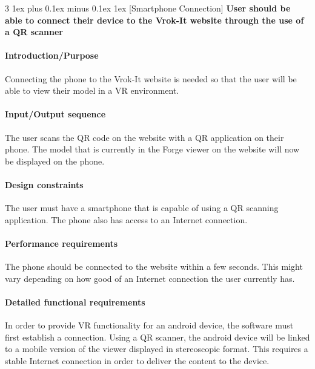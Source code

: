 \documentclass[letterpaper, 10pt, draftclsnofoot, compsoc, onecolumn]{IEEEtran}
\makeatletter
\def\subsubsection{\@startsection{subsubsection}%
                                 {3}%
                                 {\z@}%
                                 {1ex plus 0.1ex minus 0.1ex}%
                                 {1ex}%
                                 {\normalfont\normalsize}}%
\makeatother
\begin{document}

\subsubsection[{Smartphone Connection}]{\rmfamily\bfseries\color{black} User should be able to connect their 
	device to the Vrok-It website through the use of a QR scanner
}

\smallskip
\paragraph[Introduction/Purpose of this
feature]{\rmfamily\bfseries\color{black}
Introduction/Purpose }
	Connecting the phone to the Vrok-It website is needed so that the user will be able to view their model in a VR environment. 

\paragraph[Input/Output sequence for this
feature]{\rmfamily\bfseries\color{black}
Input/Output sequence }
	The user scans the QR code on the website with a QR application on their phone. The model that is currently in the Forge viewer
	on the website will now be displayed on the phone. 

\paragraph[Design constraints of this
feature]{\rmfamily\bfseries\color{black} Design
constraints }
	The user must have a smartphone that is capable of using a QR scanning application. The phone also has access to an Internet 
	connection. 

\paragraph[Performance requirements of this
feature]{\rmfamily\bfseries\color{black}
Performance requirements }
	The phone should be connected to the website within a few seconds. This might vary depending on how good of an Internet 
	connection the user currently has. 

\paragraph[Detailed functional requirements of this
feature]{\rmfamily\bfseries\color{black}
Detailed functional requirements }
	In order to provide VR functionality for an android device, the software must first establish a connection. Using a QR scanner, 
	the android device will be linked to a mobile version of the viewer displayed in stereoscopic format. This requires a stable 
	Internet connection in order to deliver the content to the device.
\end{document}
